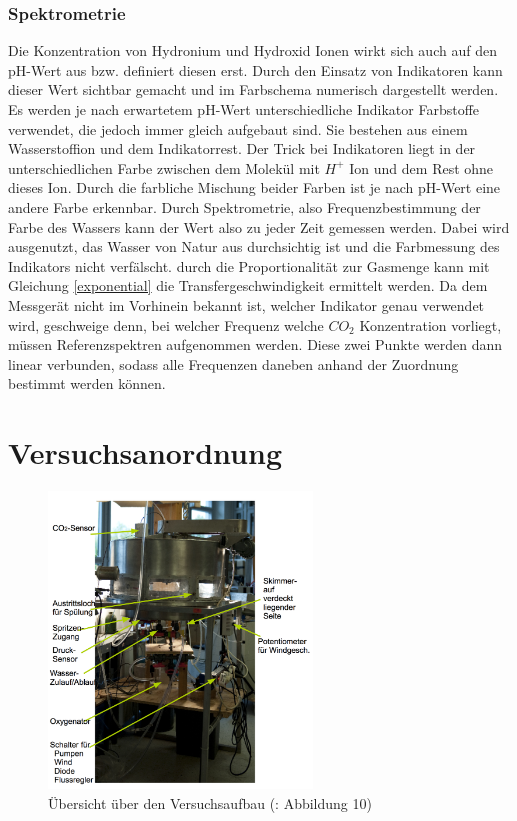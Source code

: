 \documentclass[12pt]{article}
\begin{document}
\subsubsection{Spektrometrie}
Die Konzentration von Hydronium und Hydroxid Ionen wirkt sich auch auf den pH-Wert aus bzw. definiert diesen erst. 
Durch den Einsatz von Indikatoren kann dieser Wert sichtbar gemacht und im Farbschema numerisch dargestellt werden. 
Es werden je nach erwartetem pH-Wert unterschiedliche Indikator Farbstoffe verwendet, die jedoch immer gleich aufgebaut sind. Sie bestehen aus einem Wasserstoffion und dem Indikatorrest. Der Trick bei Indikatoren liegt in der unterschiedlichen Farbe zwischen dem Molekül mit $H^+$ Ion und dem Rest ohne dieses Ion. Durch die farbliche Mischung beider Farben ist je nach pH-Wert eine andere Farbe erkennbar. 
Durch Spektrometrie, also Frequenzbestimmung der Farbe des Wassers kann der Wert also zu jeder Zeit gemessen werden. Dabei wird ausgenutzt, das Wasser von Natur aus durchsichtig ist und die Farbmessung des Indikators nicht verfälscht. durch die Proportionalität zur Gasmenge kann mit Gleichung \ref{exponential} die Transfergeschwindigkeit ermittelt werden. Da dem Messgerät nicht im Vorhinein bekannt ist, welcher Indikator genau verwendet wird, geschweige denn, bei welcher Frequenz welche $CO_2$ Konzentration vorliegt, müssen Referenzspektren aufgenommen werden. Diese zwei Punkte werden dann linear verbunden, sodass alle Frequenzen daneben anhand der Zuordnung bestimmt werden können.


\section{Versuchsanordnung}

\begin{figure}[h]
	\centering
	\includegraphics[width=70mm]{Versuchsaufbau}
	\caption{Übersicht über den Versuchsaufbau (\cite{jaehne}: Abbildung 10)\label{fig:Versuchsaufbau}}
\end{figure}
\end{document}
